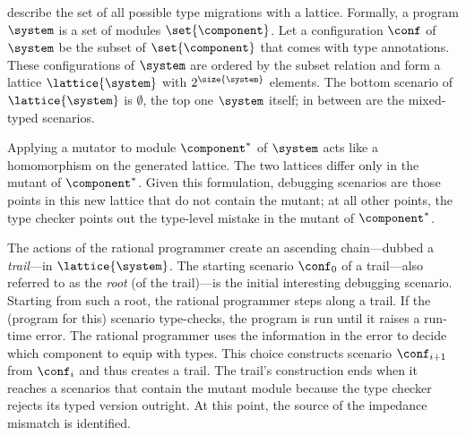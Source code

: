 
\citet{tfgnvf-popl-2016} describe the set of all possible type migrations with a
lattice. Formally, a program $\system$ is a set of modules $\set{\component}$.
Let a configuration $\conf$ of $\system$ be the subset of $\set{\component}$
that comes with type annotations. These configurations of $\system$ are ordered
by the subset relation and form a lattice $\lattice{\system}$ with
$2^{\size{\system}}$ elements. The bottom scenario of $\lattice{\system}$ is
$\emptyset$, the top one $\system$ itself; in between are the mixed-typed
scenarios.

Applying a mutator to module $\component^*$ of $\system$ acts like a homomorphism
on the generated lattice. The two lattices differ only in the mutant of
$\component^*$. Given this formulation, debugging scenarios are those points in
this new lattice that do not contain the mutant; at all other points, the type
checker points out the type-level mistake in the mutant of $\component^*$.

The actions of the rational programmer create an ascending chain---dubbed a
\emph{trail}---in $\lattice{\system}$.  The starting scenario $\conf_0$ of a
trail---also referred to as the \emph{root} (of the trail)---is the initial
interesting debugging scenario.  Starting from such a root, the rational
programmer steps along a trail. If the (program for this) scenario type-checks,
the program is run until it raises a run-time error.  The rational programmer
uses the information in the error to decide which component to equip with
types. This choice constructs scenario $\conf_{i+1}$ from $\conf_{i}$ and thus
creates a trail. The trail's construction ends when it reaches a scenarios that
contain the mutant module because the type checker rejects its typed version
outright.  At this point, the source of the impedance mismatch is identified.
